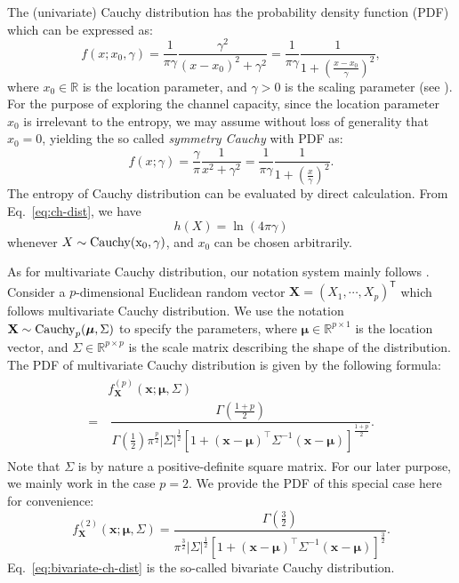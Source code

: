 \documentclass[conference]{IEEEtran}
\newcommand{\tsp}
{\mathsf{\scriptstyle{T}}}
\newcommand{\R}{\mathbb{R}}
\theoremstyle{definition}
\theoremstyle{plain}
\begin{document}
The (univariate) Cauchy distribution has the probability density function (PDF) which can be expressed as:
\begin{equation}
    f(x;x_0,\gamma) =
    \dfrac{1}{\pi \gamma} 
    \dfrac{\gamma^2}
    {(x-x_0)^2+\gamma^2
    }
    =
    \dfrac{1}{\pi \gamma} 
    \dfrac{1}
    {1+(\frac{x-x_0}{\gamma})^2
    },
\label{eq:ch-dist}
\end{equation}
where $x_0\in \mathbb{R}$ is the location parameter, and $\gamma>0$ is the scaling parameter (see \cite{shao1993signal}). 
For the purpose of exploring the channel capacity, since the location parameter $x_0$ is irrelevant to the entropy, we may assume without loss of generality that $x_0=0$, yielding
the so called \textit{symmetry Cauchy} with PDF as:
\begin{equation}
    f(x;\gamma) =
    \dfrac{\gamma}{\pi} 
    \dfrac{1}
    {x^2+\gamma^2
    }
    =
    \dfrac{1}{\pi \gamma} 
    \dfrac{1}
    {1+(\frac{x}{\gamma})^2
    }.
\label{eq:sm-ch-dist}
\end{equation}
The entropy of Cauchy distribution can be evaluated by direct calculation. From Eq.~\eqref{eq:ch-dist}, we have
\begin{equation}
    h(X)=\ln(4\pi \gamma)
\end{equation}
whenever $X\sim \rm{Cauchy}(x_0,\gamma)$, and $x_0$ can be chosen arbitrarily.


As for multivariate Cauchy distribution, our notation system mainly follows \cite{kotz2004multivariate}.
Consider a $p$-dimensional Euclidean random vector $\mathbf{X}=(X_1,\cdots,X_p)^\tsp$ which follows multivariate Cauchy distribution.
We use the notation $\mathbf{X} \sim {\rm Cauchy}_p(\boldsymbol\mu,\Sigma)$ to specify the parameters, where $\boldsymbol\mu\in\R^{p\times 1}$ is the location vector, and $\Sigma\in\R^{p\times p}$ is the scale matrix describing the shape of the distribution.
The PDF of multivariate Cauchy distribution is given by
the following formula:
\begin{align} 
\label{eq:pvariate-ch-dist}
\begin{split}
    &f_{\mathbf{X}}^{(p)}(\mathbf{x};\boldsymbol\mu,\Sigma)\\
    =&\ 
    \dfrac{\Gamma(\frac{1+p}{2})}
    {\Gamma(\frac{1}{2})\pi^{\frac{p}{2}}
    |\Sigma|^{\frac{1}{2}}
    [1+(\mathbf{x}-\boldsymbol\mu)^\top\Sigma^{-1}(\mathbf{x}-\boldsymbol\mu)]^\frac{1+p}{2}
    }.
\end{split}
\end{align}
Note that $\Sigma$ is by nature a positive-definite square matrix.
For our later purpose, we mainly work in the case $p=2$. We provide the PDF of this special case here for convenience:
\begin{equation}
    f_{\mathbf{X}}^{(2)}(\mathbf{x};\boldsymbol\mu,\Sigma)=
    \dfrac{\Gamma(\frac{3}{2})}
    {\pi^{\frac{3}{2}}
    |\Sigma|^{\frac{1}{2}}
    [1+(\mathbf{x}-\boldsymbol\mu)^\top\Sigma^{-1}(\mathbf{x}-\boldsymbol\mu)]^\frac{3}{2}
    }.
\label{eq:bivariate-ch-dist}
\end{equation}
Eq.~\eqref{eq:bivariate-ch-dist} is the so-called bivariate Cauchy distribution.
\end{document}
